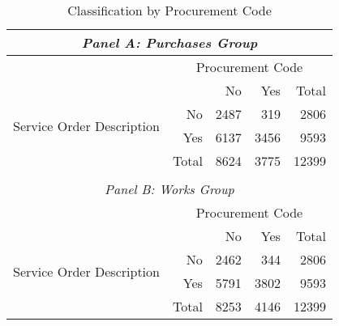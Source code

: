 \begin{table}[!htbp]
  \caption{\label{tab:textbycode}Classification by Procurement Code}
  \centering
  \footnotesize
  \begin{tabular}{crrrr}
    \hline

    \hline
    \multicolumn{5}{c}{\emph{Panel A: Purchases Group}} \T \B \\
    \hline
    & \multicolumn{4}{c}{\parbox{.25\textwidth}{\centering Procurement Code}} \T \B \\
    \multicolumn{1}{c}{\multirow{4}{*}{\parbox[c][][c]{.15\textwidth}{\centering Service Order Description}}} & \multicolumn{1}{l}{} & No & Yes & Total \T \B \\
                         \cline{2-5}
    \multicolumn{1}{c}{} & No        & 2487      & 319      & 2806  \T \B \\
    \multicolumn{1}{c}{} & Yes       & 6137      & 3456     & 9593  \T \B \\
                         \cline{2-5}
    \multicolumn{1}{c}{} & Total     & 8624      & 3775     & 12399 \T \B \\
    & & & & \\
    \hline
    \multicolumn{5}{c}{\emph{Panel B: Works Group}} \T \B \\
    \hline
    & \multicolumn{4}{c}{\parbox{.25\textwidth}{\centering Procurement Code}} \T \B \\
    \multirow{4}{*}{\parbox[c][][c]{.15\textwidth}{\centering Service Order Description}}                     & \multicolumn{1}{l}{} & No & Yes & Total \T \B \\
                         \cline{2-5}
                         & No        & 2462      & 344       & 2806  \T \B \\
                         & Yes       & 5791      & 3802      & 9593  \T \B \\
                         \cline{2-5}
                         & Total     & 8253      & 4146      & 12399 \T \B \\
    \hline

    \hline
  \end{tabular}
\end{table}